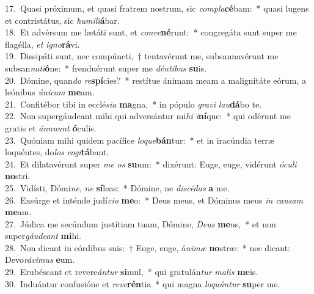 {17.~}Quasi próximum, et quasi fratrem nostrum, sic \textit{com}\textit{pla}\textbf{cé}bam:~* quasi lugens et contristátus, sic \textit{hu}\textit{mi}\textit{li}\textbf{á}bar.\\
{18.~}Et advérsum me lætáti sunt, et \textit{con}\textit{ve}\textbf{né}runt:~* congregáta sunt super me flagélla, \textit{et} \textit{i}\textit{gno}\textbf{rá}vi.\\
{19.~}Dissipáti sunt, nec compúncti,~† tentavérunt me, subsannavérunt me subsan\textit{na}\textit{ti}\textbf{ó}ne:~* frenduérunt super me \textit{dén}\textit{ti}\textit{bus} \textbf{su}is.\\
{20.~}Dómine, quan\textit{do} \textit{re}\textbf{spí}cies?~* restítue ánimam meam a malignitáte eórum, a leónibus \textit{ú}\textit{ni}\textit{cam} \textbf{me}am.\\
{21.~}Confitébor tibi in ecclé\textit{si}\textit{a} \textbf{ma}gna,~* in pópulo \textit{gra}\textit{vi} \textit{lau}\textbf{dá}bo te.\\
{22.~}Non supergáudeant mihi qui adversántur mi\textit{hi} \textit{i}\textbf{ní}que:~* qui odérunt me gratis et \textit{án}\textit{nu}\textit{unt} \textbf{ó}culis.\\
{23.~}Quóniam mihi quidem pacífice \textit{lo}\textit{que}\textbf{bán}tur:~* et in iracúndia terræ loquéntes, do\textit{los} \textit{co}\textit{gi}\textbf{tá}bant.\\
{24.~}Et dilatavérunt super \textit{me} \textit{os} \textbf{su}um:~* dixérunt: Euge, euge, vidérunt \textit{ó}\textit{cu}\textit{li} \textbf{no}stri.\\
{25.~}Vidísti, Dómi\textit{ne}, \textit{ne} \textbf{sí}leas:~* Dómine, ne \textit{di}\textit{scé}\textit{das} \textbf{a} me.\\
{26.~}Exsúrge et inténde judí\textit{ci}\textit{o} \textbf{me}o:~* Deus meus, et Dóminus meus \textit{in} \textit{cau}\textit{sam} \textbf{me}am.\\
{27.~}Júdica me secúndum justítiam tuam, Dómine, \textit{De}\textit{us} \textbf{me}us,~* et non super\textit{gáu}\textit{de}\textit{ant} \textbf{mi}hi.\\
{28.~}Non dicant in córdibus suis:~† Euge, euge, á\textit{ni}\textit{mæ} \textbf{no}stræ:~* nec dicant: Devo\textit{rá}\textit{vi}\textit{mus} \textbf{e}um.\\
{29.~}Erubéscant et revere\textit{án}\textit{tur} \textbf{si}mul,~* qui gratulán\textit{tur} \textit{ma}\textit{lis} \textbf{me}is.\\
{30.~}Induántur confusióne et \textit{re}\textit{ve}\textbf{rén}tia~* qui magna \textit{lo}\textit{quún}\textit{tur} \textbf{su}per me.\\
